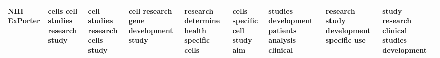 \documentclass[11pt,a4paper]{article}
\begin{document}
\begin{appendices}
\begin{table}[htp]
\begin{tiny}
\begin{tabular}{|p{}|p{}|p{}|p{}|p{}|p{}|p{}|p{}|p{}|}
NIH ExPorter & cells \newline cell \newline studies \newline research \newline study & cell \newline studies \newline research \newline cells \newline study & cell \newline research \newline gene \newline development \newline study & research \newline determine \newline health \newline specific \newline cells & cells \newline specific \newline cell \newline study \newline aim & studies \newline development \newline patients \newline analysis \newline clinical & research \newline study \newline development \newline specific \newline use & study \newline research \newline clinical \newline studies \newline development\\\hline

\end{tabular}
\end{tiny}
\end{table}
\end{appendices}
\end{document}
